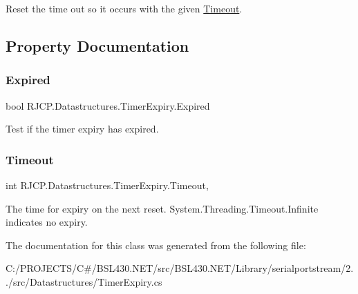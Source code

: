 Reset the time out so it occurs with the given \mbox{\hyperlink{class_r_j_c_p_1_1_datastructures_1_1_timer_expiry_ad6a62756590878b3053a15a5c112d944}{Timeout}}. 



\subsection{Property Documentation}
\mbox{\label{class_r_j_c_p_1_1_datastructures_1_1_timer_expiry_ab764bd1af3d3270ee128f649949bdb19}} 
\subsubsection{\texorpdfstring{Expired}{Expired}}
{\footnotesize\ttfamily bool R\+J\+C\+P.\+Datastructures.\+Timer\+Expiry.\+Expired\hspace{0.3cm}{\ttfamily [get]}}



Test if the timer expiry has expired. 

\mbox{\label{class_r_j_c_p_1_1_datastructures_1_1_timer_expiry_ad6a62756590878b3053a15a5c112d944}} 
\subsubsection{\texorpdfstring{Timeout}{Timeout}}
{\footnotesize\ttfamily int R\+J\+C\+P.\+Datastructures.\+Timer\+Expiry.\+Timeout\hspace{0.3cm}{\ttfamily [get]}, {\ttfamily [set]}}



The time for expiry on the next reset. System.\+Threading.\+Timeout.\+Infinite indicates no expiry. 



The documentation for this class was generated from the following file\+:\begin{DoxyCompactItemize}
\item 
C\+:/\+P\+R\+O\+J\+E\+C\+T\+S/\+C\#/\+B\+S\+L430.\+N\+E\+T/src/\+B\+S\+L430.\+N\+E\+T/\+Library/serialportstream/2../src/\+Datastructures/Timer\+Expiry.\+cs\end{DoxyCompactItemize}
